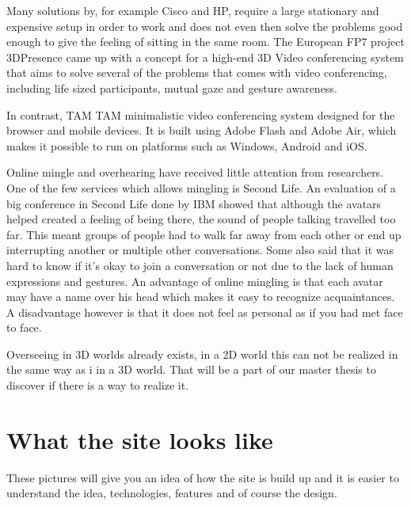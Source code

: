 \documentclass[12pt, titlepage]{article}
\begin{document}
Many solutions by, for example Cisco and HP, require a large stationary and expensive setup in order to work and does not even then solve the problems good enough to give the feeling of sitting in the same room. The European FP7 project 3DPresence\cite{23} came up with a concept for a high-end 3D Video conferencing system that aims to solve several of the problems that comes with video conferencing, including life sized participants, mutual gaze and gesture awareness.

In contrast, TAM TAM\cite{24} minimalistic video conferencing system designed for the browser and mobile devices. It is built using Adobe Flash and Adobe Air, which makes it possible to run on platforms such as Windows, Android and iOS.

Online mingle and overhearing have received little attention from researchers. One of the few services which allows mingling is Second Life\cite{3}. An evaluation of a big conference in Second Life done by IBM\cite{1} showed that although the avatars helped created a feeling of being there, the sound of people talking travelled too far. This meant groups of people had to walk far away from each other or end up interrupting another or multiple other conversations. Some also said that it was hard to know if it's okay to join a conversation or not due to the lack of human expressions and gestures. An advantage of online mingling is that each avatar may have a name over his head which makes it easy to recognize acquaintances. A disadvantage however is that it does not feel as personal as if you had met face to face\cite{1}.

Overseeing in 3D worlds already exists\cite{2}\cite{3}\cite{4}\cite{5}, in a 2D world this can not be realized in the same way as i in a 3D world. That will be a part of our master thesis to discover if there is a way to realize it.
\section{What the site looks like}
These pictures will give you an idea of how the site is build up and it is easier to understand the idea, technologies, features and of course the design.
\end{document}
